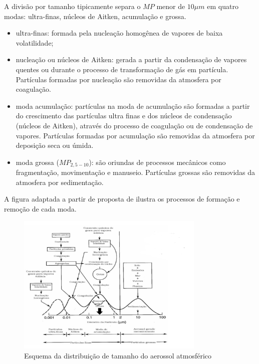 A divisão por tamanho tipicamente separa o $MP$ menor de 
$10 \mu m$ em quatro modas:
ultra-finas, núcleos de Aitken, acumulação e grossa. 

\begin{itemize}
  \item ultra-finas: formada pela nucleação homogênea de vapores de baixa volatilidade;
  \item nucleação ou núcleos de Aitken: 
        gerada a partir da condensação de vapores quentes ou durante o processo de 
        transformação de gás em partícula. Partículas formadas por 
        nucleação são removidas da atmosfera por coagulação.   
  \item moda acumulação: 
         partículas na moda de acumulação são formadas 
         a partir do crescimento das partículas ultra finas e dos núcleos 
         de condensação (núcleos de Aitken), através do processo de 
         coagulação ou de condensação de vapores. 
         Partículas formadas por acumulação
         são removidas da atmosfera por deposição seca ou úmida.%
  \item moda grossa ($MP_{2,5-10}$):
        são oriundas de processos mecânicos como fragmentação, 
        movimentação e manuseio. Partículas grossas são removidas da atmosfera 
        por sedimentação.
\end{itemize}

A figura adaptada a partir de proposta de \citep{finlayson1999} ilustra os processos de 
formação e remoção de cada moda.


\begin{figure}[H]
\begin{center}
  \includegraphics[width=0.8\textwidth]{../inputs/images/modas_aerossol.png}
  \caption{Esquema da distribuição de tamanho do aerossol atmosférico 
           \citep{finlayson1999} \label{fig:modas_aerossol}}
\end{center}
\end{figure}

